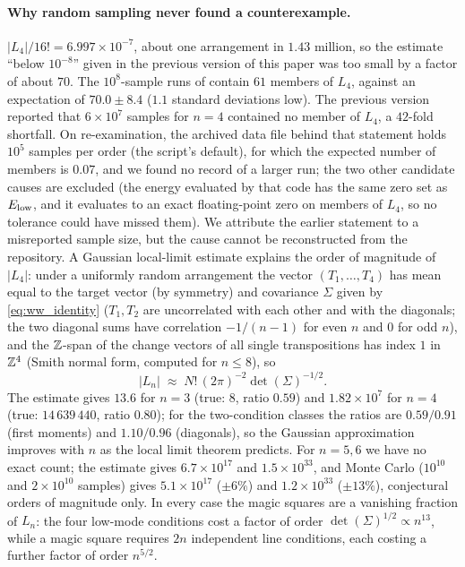\paragraph{Why random sampling never found a counterexample.}
$|L_4|/16! = 6.997\times10^{-7}$, about one arrangement in $1.43$ million, so the estimate ``below $10^{-8}$'' given in the
previous version of this paper was too small by a factor of about $70$.  The $10^8$-sample runs of 
contain $61$ members of $L_4$, against an expectation of $70.0\pm8.4$ ($1.1$ standard deviations low).  The previous version
reported that $6\times10^7$ samples for $n=4$ contained no member of $L_4$, a $42$-fold shortfall.  On re-examination, the
archived data file behind that statement holds $10^5$ samples per order (the script's default), for which the expected number
of members is $0.07$, and we found no record of a larger run; the two other candidate causes are excluded (the energy evaluated
by that code has the same zero set as $E_{\mathrm{low}}$, and it evaluates to an exact floating-point zero on members of $L_4$, so no
tolerance could have missed them).  We attribute the earlier statement to a misreported sample size, but the cause cannot be
reconstructed from the repository.
A Gaussian local-limit estimate explains the order of magnitude of $|L_4|$: under a uniformly random arrangement the vector
$(T_1,\dots,T_4)$ has mean equal to the target vector (by symmetry) and covariance $\Sigma$ given by \eqref{eq:ww_identity} ($T_1,T_2$ are uncorrelated with each other and with the
diagonals; the two diagonal sums have correlation $-1/(n-1)$ for even $n$ and $0$ for odd $n$), and the $\mathbb{Z}$-span of the
change vectors of all single transpositions has index $1$ in $\mathbb{Z}^4$ (Smith normal form, computed for $n\le8$), so
\[
  |L_n| \;\approx\; N!\,(2\pi)^{-2}\det(\Sigma)^{-1/2}.
\]
The estimate gives $13.6$ for $n=3$ (true: $8$, ratio $0.59$) and $1.82\times10^{7}$ for $n=4$ (true:
$14\,639\,440$, ratio $0.80$); for the two-condition classes the ratios are $0.59/0.91$ (first moments)
and $1.10/0.96$ (diagonals), so the Gaussian approximation improves with $n$ as the local limit theorem
predicts.  For $n=5,6$ we have no exact count; the estimate gives $6.7\times10^{17}$ and $1.5\times10^{33}$, and Monte Carlo
($10^{10}$ and $2\times10^{10}$ samples) gives $5.1\times10^{17}$ ($\pm6\%$) and $1.2\times10^{33}$ ($\pm13\%$), conjectural
orders of magnitude only.
In every case the magic squares are a vanishing fraction of $L_n$: the four low-mode conditions cost a factor of order
$\det(\Sigma)^{1/2}\propto n^{13}$, while a magic square requires $2n$ independent line conditions, each costing a further
factor of order $n^{5/2}$.


